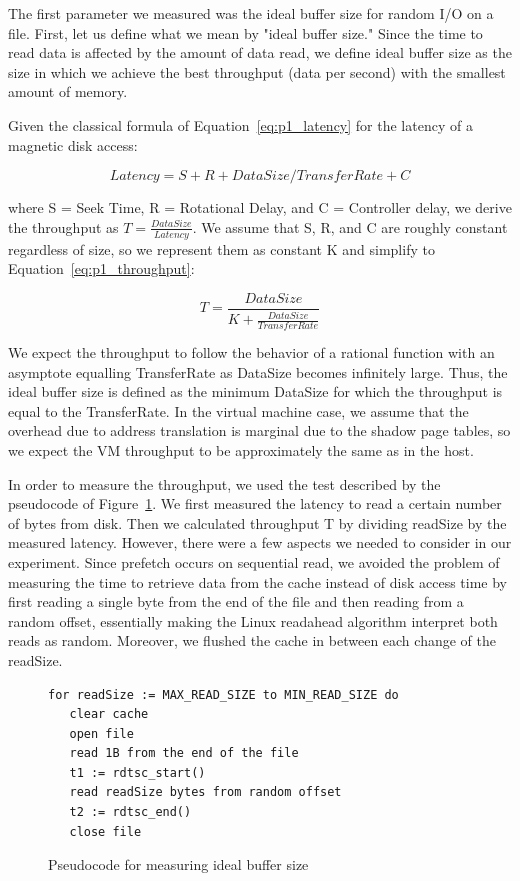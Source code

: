 The first parameter we measured was the ideal buffer size for random I/O 
on a file. First, let us define what we mean by "ideal buffer size." Since
the time to read data is affected by the amount of data read, we define ideal
buffer size as the size in which we achieve the best throughput (data per second)
with the smallest amount of memory. 

Given the classical formula of Equation~\ref{eq:p1_latency} for the latency 
of a magnetic disk access:

\begin{equation}\label{eq:p1_latency}
Latency = S + R + DataSize/TransferRate + C
\end{equation}

where S = Seek Time, R = Rotational Delay, and C = Controller delay, we 
derive the throughput as $T = \frac{DataSize}{Latency}$. We assume that S, R, 
and C are roughly constant regardless of size, so we represent them as constant K and simplify to Equation~\ref{eq:p1_throughput}:

\begin{equation}\label{eq:p1_throughput}
T = \frac{DataSize}{K + \frac{DataSize}{TransferRate}}
\end{equation}

We expect the throughput to follow the behavior of a rational function
with an asymptote equalling TransferRate as DataSize becomes infinitely large.
Thus, the ideal buffer size is defined as the minimum DataSize for which the 
throughput is equal to the TransferRate. In the virtual machine case, we assume 
that the overhead due to address translation is marginal due to the shadow page 
tables, so we expect the VM throughput to be approximately the same as in the host.

In order to measure the throughput, we used the test described by the pseudocode 
of Figure~\ref{fig:p1code}. We first measured the latency to read a
certain number of bytes from disk. Then we calculated throughput T by dividing 
readSize by the measured latency. However, there were a few aspects we needed 
to consider in our experiment. Since prefetch occurs on sequential read, 
we avoided the problem of measuring the time to retrieve data from the cache instead
of disk access time by first reading a single byte from the end of the file
and then reading from a random offset, essentially making the Linux readahead
algorithm interpret both reads as random. Moreover, we flushed the cache in
between each change of the readSize. 

\begin{figure}[h!]
\begin{lstlisting}
for readSize := MAX_READ_SIZE to MIN_READ_SIZE do
   clear cache
   open file
   read 1B from the end of the file
   t1 := rdtsc_start()
   read readSize bytes from random offset 
   t2 := rdtsc_end()
   close file
\end{lstlisting} 
\caption{Pseudocode for measuring ideal buffer size}
\label{fig:p1code}
\end{figure}

